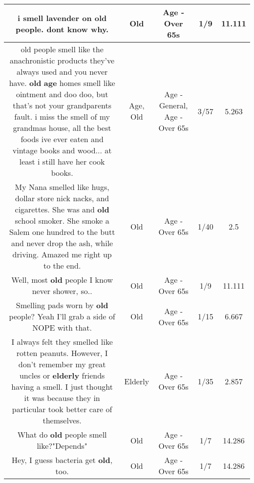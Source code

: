 \documentclass[11pt]{article}
\newlength\mylength
\begin{document}
\begin{center}
\begin{longtable}{|C{.65\mylength}|C{.30\mylength}|C{.12\mylength}|C{.12\mylength}|C{.12\mylength}|}
  \small i smell lavender on \textbf{old} people. dont know why.\normalsize   & Old & Age - Over 65s & 1/9 & 11.111 \\  \hline
  \small old people smell like the anachronistic products they've always used and you never have. \textbf{old} \textbf{age} homes smell like ointment and doo doo, but that's not your grandparents fault. i miss the smell of my grandmas house, all the best foods ive ever eaten and vintage books and wood... at least i still have her cook books.\normalsize   & Age, Old & Age - General, Age - Over 65s & 3/57 & 5.263 \\  \hline
  \small My Nana smelled like hugs, dollar store nick nacks, and cigarettes. She was and \textbf{old} school smoker. She smoke a Salem one hundred to the butt and never drop the ash, while driving. Amazed me right up to the end.\normalsize   & Old & Age - Over 65s & 1/40 & 2.5 \\  \hline
  \small Well, most \textbf{old} people I know never shower, so..\normalsize   & Old & Age - Over 65s & 1/9 & 11.111 \\  \hline
  \small Smelling pads worn by \textbf{old} people? Yeah I'll grab a side of NOPE with that.\normalsize   & Old & Age - Over 65s & 1/15 & 6.667 \\  \hline
  \small I always felt they smelled like rotten peanuts. However, I don't remember my great uncles or \textbf{elderly} friends having a smell. I just thought it was because they in particular took better care of themselves.\normalsize   & Elderly & Age - Over 65s & 1/35 & 2.857 \\  \hline
  \small What do \textbf{old} people smell like?"Depends"\normalsize   & Old & Age - Over 65s & 1/7 & 14.286 \\  \hline
  \small Hey, I guess bacteria get \textbf{old}, too.\normalsize   & Old & Age - Over 65s & 1/7 & 14.286 \\  \hline

\end{longtable}
\end{center}
\end{document}
